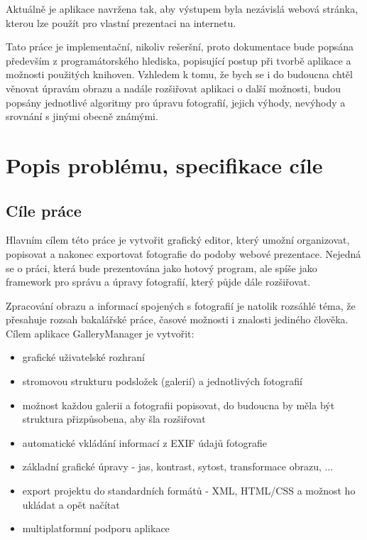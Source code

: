 \documentclass[11pt,twoside,a4paper]{book}
\begin{document}
\indent
Aktuálně je aplikace navržena tak, aby výstupem byla nezávislá webová stránka, kterou lze použít pro vlastní prezentaci na internetu.

\indent
Tato práce je implementační, nikoliv rešeršní, proto dokumentace bude popsána především z programátorského hlediska, popisující postup při tvorbě aplikace a možnosti použitých knihoven. Vzhledem k tomu, že bych se i do budoucna chtěl věnovat úpravám obrazu a nadále rozšiřovat aplikaci o další možnosti, budou popsány jednotlivé algoritmy pro úpravu fotografií, jejich výhody, nevýhody a srovnání s jinými obecně známými.


\chapter{Popis problému, specifikace cíle}
\section{Cíle práce}

\noindent
Hlavním cílem této práce je vytvořit grafický editor, který umožní organizovat, popisovat a nakonec exportovat fotografie do podoby webové prezentace. Nejedná se o práci, která bude prezentována jako hotový program, ale spíše jako framework pro správu a úpravy fotografií, který půjde dále rozšiřovat.

\indent
Zpracování obrazu a informací spojených s fotografií je natolik rozsáhlé téma, že přesahuje rozsah bakalářské práce, časové možnosti i znalosti jediného člověka. Cílem aplikace GalleryManager je vytvořit:

\begin{itemize}
\item grafické uživatelské rozhraní
\item stromovou strukturu podsložek (galerií) a jednotlivých fotografií
\item možnost každou galerii a fotografii popisovat, do budoucna by měla být struktura přizpůsobena, aby šla rozšiřovat
\item automatické vkládání informací z EXIF údajů fotografie
\item základní grafické úpravy - jas, kontrast, sytost, transformace obrazu, ...
\item export projektu do standardních formátů - XML, HTML/CSS a možnost ho ukládat a opět načítat
\item multiplatformní podporu aplikace
\end{itemize}
\end{document}
